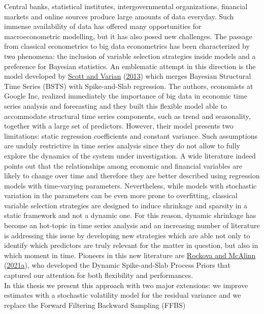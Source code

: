 \documentclass[
  12pt,
]{book}
\theoremstyle{break}
\theoremstyle{nonumberplain}
\begin{document}
Central banks, statistical institutes, intergovernmental organizations,
financial markets and online sources produce large amounts of data
everyday. Such immense availability of data has offered many
opportunities for macroeconometric modelling, but it has also posed new
challenges. The passage from classical econometrics to big data
econometrics has been characterized by two phenomena: the inclusion of
variable selection strategies inside models and a preference for
Bayesian statistics. An emblematic attempt in this direction is the
model developed by \protect\hyperlink{ref-scott_varian_2013}{Scott and
Varian} (\protect\hyperlink{ref-scott_varian_2013}{2013}) which merges
Bayesian Structural Time Series (BSTS) with Spike-and-Slab regression.
The authors, economists at Google Inc, realized immediately the
importance of big data in economic time series analysis and forecasting
and they built this flexible model able to accommodate structural time
series components, such as trend and seasonality, together with a large
set of predictors. However, their model presents two limitations: static
regression coefficients and constant variance. Such assumptions are
unduly restrictive in time series analysis since they do not allow to
fully explore the dynamics of the system under investigation. A wide
literature indeed points out that the relationships among economic and
financial variables are likely to change over time and therefore they
are better described using regression models with time-varying
parameters. Nevertheless, while models with stochastic variation in the
parameters can be even more prone to overfitting, classical variable
selection strategies are designed to induce shrinkage and sparsity in a
static framework and not a dynamic one. For this reason, dynamic
shrinkage has become an hot-topic in time series analysis and an
increasing number of literature is addressing this issue by developing
new strategies which are able not only to identify which predictors are
truly relevant for the matter in question, but also in which moment in
time. Pioneers in this new literature are
\protect\hyperlink{ref-rockova_mcalinn_2021}{Rockova and McAlinn}
(\protect\hyperlink{ref-rockova_mcalinn_2021}{2021a}), who developed the
Dynamic Spike-and-Slab Process Priors that captured our attention for
both flexibility and performances.\\
In this thesis we present this approach with two major extensions: we
improve estimates with a stochastic volatility model for the residual
variance and we replace the Forward Filtering Backward Sampling (FFBS)
\end{document}
